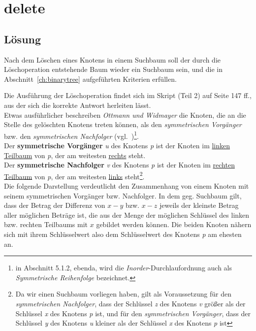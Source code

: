 \chapter{delete}

\section*{Lösung}

Nach dem Löschen eines Knotens in einem Suchbaum soll der durch die Löschoperation entstehende Baum wieder ein Suchbaum sein, und die in Abschnitt~\ref{ch:binarytree} aufgeführten Kriterien erfüllen.

Die Ausführung der Löschoperation findet sich im Skript (Teil 2) auf Seite 147 ff., aus der sich die korrekte Antwort herleiten lässt.
\\

Etwas ausführlicher beschreiben \textit{Ottmann und Widmayer} die Knoten, die an die Stelle des gelöschten Knotens treten können, als den \textit{symmetrischen Vorgänger} bzw. den \textit{symmetrischen Nachfolger} (vgl.~\cite[288 f.]{OW17e})\footnote{
in Abschnitt 5.1.2, ebenda, wird die \textit{Inorder}-Durchlaufordnung auch als \textit{Symmetrische Reihenfolge} bezeichnet.
}.
\\

Der \textbf{symmetrische Vorgänger} \textit{u} des Knotens \textit{p} ist der Knoten im \underline{linken Teilbaum} von \textit{p}, der am weitesten \underline{rechts} steht.
\\

Der \textbf{symmetrische Nachfolger} \textit{v} des Knotens \textit{p} ist der Knoten im \underline{rechten Teilbaum} von \textit{p}, der am weitesten \underline{links} steht\footnote{
    Da wir einen Suchbaum vorliegen haben, gilt als Voraussetzung für den \textit{symmetrischen Nachfolger}, dass der Schlüssel \textit{z} des Knotens \textit{v} größer als der Schlüssel \textit{x} des Knotens \textit{p} ist, und für den \textit{symmetrischen Vorgänger}, dass der Schlüssel \textit{y} des Knotens \textit{u}  kleiner als der Schlüssel \textit{x} des Knotens \textit{p} ist
}.
\\

Die folgende Darstellung verdeutlicht den Zusammenhang von einem Knoten mit seinem symmetrischen Vorgänger {bzw.} Nachfolger.
In dem  {geg.} Suchbaum gilt, dass der Betrag der Differenz von $x - y$ bzw. $x - z$ jeweils der kleinste Betrag aller möglichen Beträge ist, die aus der Menge der möglichen Schlüssel des linken {bzw.} rechten Teilbaums mit $x$ gebildet werden können.
Die beiden Knoten nähern sich mit ihrem Schlüsselwert also dem Schlüsselwert des Knotens \textit{p} am ehesten an.


